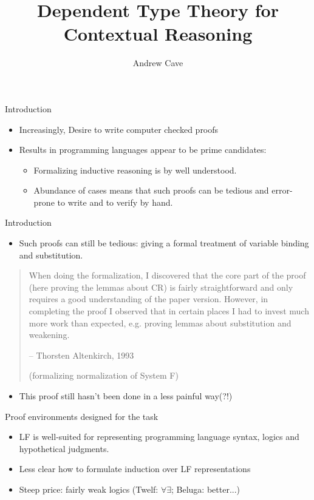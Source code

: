 \documentclass[usenames,dvipsnames]{beamer}
\author{Andrew Cave}
\title[{\makebox[.45\paperwidth]{Dependent Type Theory for Contextual Reasoning\hfill%
       \insertframenumber/\inserttotalframenumber}}]{Dependent Type Theory for Contextual Reasoning}
\begin{document}
\begin{frame}
\titlepage
\end{frame}

\begin{frame}{Introduction}
\begin{itemize}
\item Increasingly, Desire to write computer checked proofs
\item Results in programming languages appear to be prime
candidates:
\begin{itemize}
\item Formalizing inductive reasoning is by well understood.
\item Abundance of cases means that such proofs can be
tedious and error-prone to write and to verify by hand.
\end{itemize}
\end{itemize}
\end{frame}

\begin{frame}{Introduction}
\begin{itemize}
\item Such proofs can still be tedious: giving a formal treatment of variable binding and
substitution.
\end{itemize}
\begin{quote}
When doing the formalization, I discovered that the core part of the
proof (here proving the lemmas about CR) is fairly straightforward and
only requires a good understanding of the paper version. However, in
completing the proof I observed that in certain places I had to invest
much more work than expected, e.g. proving lemmas about substitution
and weakening.

-- Thorsten Altenkirch, 1993

   (formalizing normalization of System F)
\end{quote}
\pause
\begin{itemize}
\item This proof still hasn't been done in a less painful way(?!)
\end{itemize}
\end{frame}

\begin{frame}{Proof environments designed for the task}
\begin{itemize}
\item LF is well-suited for representing
programming language syntax, logics and hypothetical
judgments.
\item Less clear how to formulate induction
over LF representations
\item Steep price: fairly weak logics (Twelf: $\forall\exists$; Beluga: better...)
\end{itemize}
\end{frame}
\end{document}
